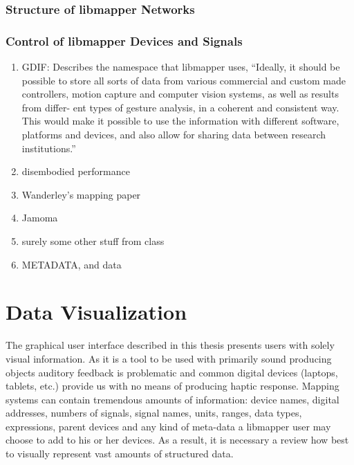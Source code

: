 	\subsubsection{Structure of libmapper Networks}
	\subsubsection{Control of libmapper Devices and Signals}
\begin{enumerate}
	\item GDIF:  Describes the namespace that libmapper uses, ``Ideally, it should be possible to store all sorts of data from various commercial and custom made controllers, motion capture and computer vision systems, as well as results from differ- ent types of gesture analysis, in a coherent and consistent way. This would make it possible to use the information with different software, platforms and devices, and also allow for sharing data between research institutions.'' 
	\item disembodied performance
	\item Wanderley's mapping paper  
	\item Jamoma 
	\item surely some other stuff from class
	\item METADATA, and data
\end{enumerate}

			\section{Data Visualization}


The graphical user interface described in this thesis presents users with solely visual information. As it is a tool to be used with primarily sound producing objects auditory feedback is problematic and common digital devices (laptops, tablets, etc.) provide us with no means of producing haptic response. Mapping systems can contain tremendous amounts of information: device names, digital addresses, numbers of signals, signal names, units, ranges, data types, expressions, parent devices and any kind of meta-data a libmapper user may choose to add to his or her devices. As a result, it is necessary a review how best to visually represent vast amounts of structured data.

